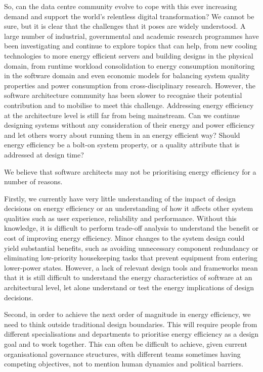 So, can the data centre community evolve to cope with this ever increasing demand and support the world's relentless digital transformation? We cannot be sure, but it is clear that the challenges that it poses are widely understood.  A large number of industrial, governmental and academic research programmes \cite{loken2010-scinet, bahsoon2010-cloudpower, greengrid2011-dcefficiency, dc4cities2014_dcmetrics,ida2015-gdcip} have been investigating and continue to explore topics that can help, from new cooling technologies to more energy efficient servers and building designs in the physical domain, from runtime workload consolidation to energy consumption monitoring in the software domain and even economic models for balancing system quality properties and power consumption from cross-disciplinary research. However, the software architecture community has been slower to recognise their potential contribution and to mobilise to meet this challenge. Addressing energy efficiency at the architecture level is still far from being mainstream. Can we continue designing systems without any consideration of their energy and power efficiency and let others worry about running them in an energy efficient way? Should energy efficiency be a bolt-on system property, or a quality attribute that is addressed at design time?

We believe that software architects may not be prioritising energy efficiency for a number of reasons.

Firstly, we currently have very little understanding of the impact of design decisions on energy efficiency or an understanding of how it affects other system qualities such as user experience, reliability and performance.  Without this knowledge, it is difficult to perform trade-off analysis to understand the benefit or cost of improving energy efficiency. Minor changes to the system design could yield substantial benefits, such as avoiding unnecessary component redundancy or eliminating low-priority housekeeping tasks that prevent equipment from entering lower-power states. However, a lack of relevant design tools and frameworks mean that it is still difficult to understand the energy characteristics of software at an architectural level, let alone understand or test the energy implications of design decisions. 

Second, in order to achieve the next order of magnitude in energy efficiency, we need to think outside traditional design boundaries. This will require people from different specialisations and departments to prioritise energy efficiency as a design goal and to work together. This can often be difficult to achieve, given current organisational governance structures, with different teams sometimes having competing objectives, not to mention human dynamics and political barriers.

